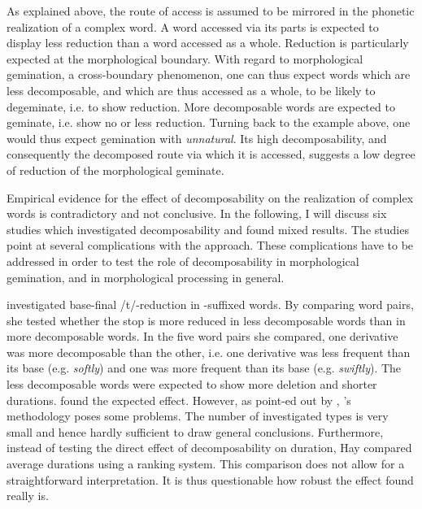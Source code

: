 As explained above, the route of access is assumed to be mirrored in the phonetic realization of a complex word. A word accessed via its parts is expected to display less reduction than a word accessed as a whole. Reduction is particularly expected at the morphological boundary. With regard to morphological gemination, a cross-boundary phenomenon, one can thus expect words which are less decomposable, and which are thus accessed as a whole, to be likely to degeminate, i.e. to show reduction. More decomposable words are expected to geminate, i.e. show no or less reduction. 
Turning back to the example above, one would thus expect gemination with \textit{unnatural}. Its high decomposability, and consequently the decomposed route via which it is accessed, suggests a low degree of reduction of the morphological geminate.


Empirical evidence for the effect of decomposability on the realization of complex words is contradictory and not conclusive. In the following, I will discuss six studies which investigated decomposability and found mixed results. The studies point at several complications with the approach. These complications have to be addressed in order to test the role of decomposability in morphological gemination, and in morphological processing in general. 

 \cite{Hay.2003} investigated  base-final /t/-reduction in -suffixed words. By comparing word pairs, she tested whether the stop is more reduced in less decomposable words than in more decomposable words. In the five word pairs she compared, one derivative was more decomposable than the other, i.e. one derivative was less frequent than its base (e.g. \textit{softly}) and one was more frequent than its base (e.g. \textit{swiftly}). The less decomposable words were expected to show more deletion and shorter durations.  \citeauthor{Hay.2003} found the expected effect. 
 However, as point-ed out by \cite{Hanique.2012}, \citeauthor{Hay.2003}'s methodology poses some problems. The number of investigated types is very small and hence hardly sufficient to draw general conclusions. Furthermore, instead of testing the direct effect of decomposability on duration, Hay compared average durations using a ranking system. This comparison does not allow for a straightforward interpretation. It is thus questionable how robust the effect found really is.

